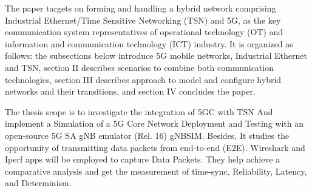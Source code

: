   
 

 The paper targets on forming and handling a hybrid network comprising Industrial Ethernet/Time Sensitive Networking (TSN) and 5G, as the key communication system representatives of operational technology (OT) and information and communication technology (ICT) industry. It is organized as follows: the subsections below introduce 5G mobile networks, Industrial Ethernet and TSN, section II describes scenarios to combine both communication technologies, section III describes approach to model and configure hybrid networks and their transitions, and section IV concludes the paper.
 
  
The thesis scope is to investigate the integration of 5GC with TSN And implement a Simulation of a 5G Core Network Deployment and Testing with an open-source 5G SA gNB emulator (Rel. 16) gNBSIM. Besides, It studies the opportunity of transmitting data packets from end-to-end (E2E). Wireshark and Iperf apps will be employed to capture Data Packets. They help achieve a comparative analysis and get the measurement of time-sync, Reliability, Latency, and Determinism.   


  
  
  




\acresetall%
